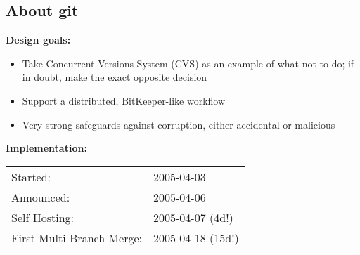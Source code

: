 \subsection{About git}
\begin{frame}
  \subslidetitle
  \textbf{Design goals:}
  \pause
  \begin{itemize}
    \item Take Concurrent Versions System (CVS) as an example of what not to do; if in doubt, make the exact opposite decision
    \pause
    \item Support a distributed, BitKeeper-like workflow
    \pause
    \item Very strong safeguards against corruption, either accidental or malicious
    \pause
  \end{itemize}

  \vspace{2em}
  \textbf{Implementation:}
  \\
  \pause
  \begin{tabular}{ll}
    Started: & 2005-04-03 \\
  \pause
    Announced: &2005-04-06 \\
    \pause
    Self Hosting: & 2005-04-07 (4d!) \\
    \pause
    First Multi Branch Merge: & 2005-04-18 (15d!)
  \end{tabular}

\end{frame}

